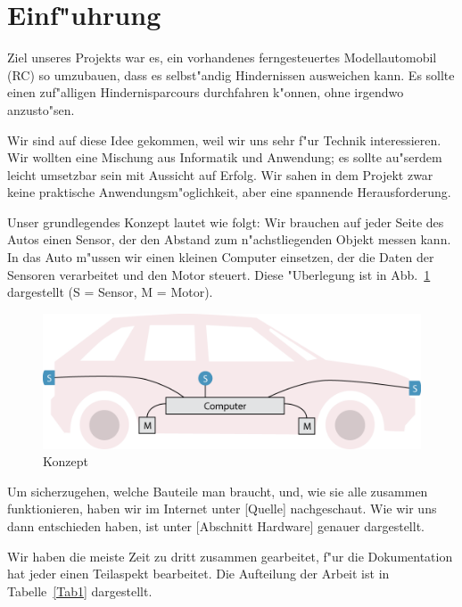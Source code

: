 \documentclass[a4paper,12pt]{article}
\begin{document}
\newpage


\tableofcontents

\newpage


\section{Einf"uhrung}\label{sec1}

Ziel unseres Projekts war es, ein vorhandenes ferngesteuertes Modellautomobil (RC) so umzubauen, dass es selbst"andig Hindernissen ausweichen kann.
Es sollte einen zuf"alligen Hindernisparcours durchfahren k"onnen, ohne irgendwo anzusto"sen.

Wir sind auf diese Idee gekommen, weil wir uns sehr f"ur Technik interessieren.
Wir wollten eine Mischung aus Informatik und Anwendung; es sollte au"serdem leicht umsetzbar sein mit Aussicht auf Erfolg.
Wir sahen in dem Projekt zwar keine praktische Anwendungsm"oglichkeit, aber eine spannende Herausforderung.

Unser grundlegendes Konzept lautet wie folgt:
Wir brauchen auf jeder Seite des Autos einen Sensor, der den Abstand zum n"achstliegenden Objekt messen kann.
In das Auto m"ussen wir einen kleinen Computer einsetzen, der die Daten der Sensoren verarbeitet und den Motor steuert.
Diese "Uberlegung ist in Abb.~\ref{Fig1} dargestellt (S = Sensor, M = Motor).

\begin{figure}[h]
	\centering
	\includegraphics[width=12cm]{./media/overview.png}
	\caption{Konzept}
	\label{Fig1}
\end{figure}

Um sicherzugehen, welche Bauteile man braucht, und, wie sie alle zusammen funktionieren, haben wir im Internet unter [Quelle] nachgeschaut.
Wie wir uns dann entschieden haben, ist unter [Abschnitt Hardware] genauer dargestellt.

Wir haben die meiste Zeit zu dritt zusammen gearbeitet, f"ur die Dokumentation hat jeder einen Teilaspekt bearbeitet.
Die Aufteilung der Arbeit ist in Tabelle~\ref{Tab1} dargestellt.
\end{document}
